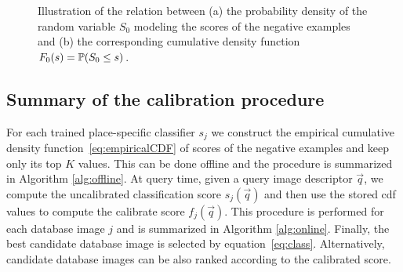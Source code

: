       \begin{figure}[t]
         \vspace*{-3mm}
         \caption{Illustration of the relation between (a) the probability density of the random variable $S_0$ modeling the scores of the negative examples and (b) the corresponding cumulative density function $F_0(s)=\mathbb{P}(S_0 \leq s)$.
         }
               \vspace*{-3mm}
         \label{fig:qntExample}
      \end{figure}
      
      
   \subsection{Summary of the calibration procedure}
    
    For each trained place-specific classifier $s_j$ we construct the empirical cumulative density function~\eqref{eq:empiricalCDF} of scores of the negative examples and keep only its top $K$ values. This can be done offline and the procedure is summarized in Algorithm \ref{alg:offline}. 
    At query time, given a query image descriptor $\vec{q}$, we compute the uncalibrated classification score $s_j(\vec{q})$ and then use the stored cdf values to compute the calibrate score $f_j(\vec{q})$. This procedure is performed for each database image $j$ and is summarized in Algorithm \ref{alg:online}.
    Finally, the best candidate database image is selected by equation~\eqref{eq:class}. Alternatively, candidate database images can be also ranked according to the calibrated score.
 
